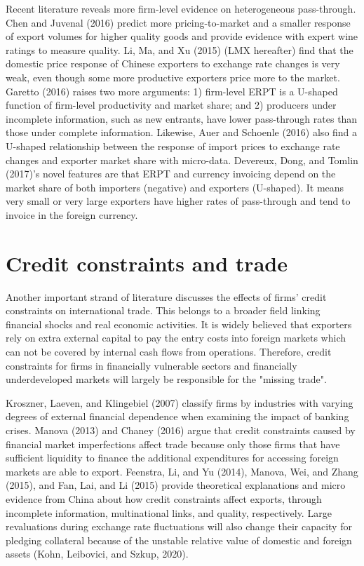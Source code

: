 Recent literature reveals more firm-level evidence on heterogeneous pass-through. Chen and Juvenal (2016)\cite{chen2016} predict more pricing-to-market and a smaller response of export volumes for higher quality goods and provide evidence with expert wine ratings to measure quality. Li, Ma, and Xu (2015)\cite{lmx2015} (LMX hereafter) find that the domestic price response of Chinese exporters to exchange rate changes is very weak, even though some more productive exporters price more to the market. Garetto (2016)\cite{garetto2016} raises two more arguments: 1) firm-level ERPT is a U-shaped function of firm-level productivity and market share; and 2) producers under incomplete information, such as new entrants, have lower pass-through rates than those under complete information. Likewise, Auer and Schoenle (2016)\cite{auer2016} also find a U-shaped relationship between the response of import prices to exchange rate changes and exporter market share with micro-data. Devereux, Dong, and Tomlin (2017)\cite{devereux2017}'s novel features are that ERPT and currency invoicing depend on the market share of both importers (negative) and exporters (U-shaped). It means very small or very large exporters have higher rates of pass-through and tend to invoice in the foreign currency.

\section{Credit constraints and trade}

Another important strand of literature discusses the effects of firms' credit constraints on international trade. This belongs to a broader field linking financial shocks and real economic activities. It is widely believed that exporters rely on extra external capital to pay the entry costs into foreign markets which can not be covered by internal cash flows from operations. Therefore, credit constraints for firms in financially vulnerable sectors and financially underdeveloped markets will largely be responsible for the "missing trade".

Kroszner, Laeven, and Klingebiel (2007)\cite{kroszner2007} classify firms by industries with varying degrees of external financial dependence when examining the impact of banking crises. Manova (2013)\cite{manova2013} and Chaney (2016)\cite{chaney2016} argue that credit constraints caused by financial market imperfections affect trade because only those firms that have sufficient liquidity to finance the additional expenditures for accessing foreign markets are able to export. Feenstra, Li, and Yu (2014)\cite{feenstra-li-yu2014}, Manova, Wei, and Zhang (2015)\cite{manova-wei-zhang2015}, and Fan, Lai, and Li (2015)\cite{fan-lai-li2015} provide theoretical explanations and micro evidence from China about how credit constraints affect exports, through incomplete information, multinational links, and quality, respectively. Large revaluations during exchange rate fluctuations will also change their capacity for pledging collateral because of the unstable relative value of domestic and foreign assets (Kohn, Leibovici, and Szkup, 2020\cite{kohn2020}). 

